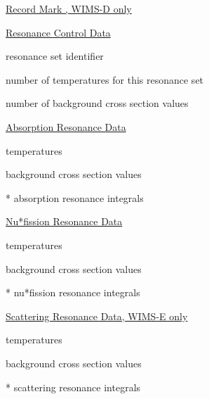 \noindent
\underline{Record Mark , WIMS-D only}
\vspace{12pt}


\noindent
\underline{Resonance Control Data}

\begin{list}{}{\setlength{\leftmargin}{2in}\setlength{\labelwidth}{1.7in}}
\item[\cword{RID}\hfill] resonance set identifier
\item[\cword{NTEMP}\hfill] number of temperatures for this resonance set
\item[\cword{NSIGZ}\hfill] number of background cross section values
\end{list}

\noindent
\underline{Absorption Resonance Data}

\begin{list}{}{\setlength{\leftmargin}{2in}\setlength{\labelwidth}{1.7in}}
\item[\cword{(TEMP(I),I=1,NTEMP)}\hfill] temperatures
\item[\cword{(SIGZ(I),I=1,NSIGZ)}\hfill] background cross section values
\item[\cword{(RESA(I),I=1,NTEMP}*\cword{NSIGZ}\hfill] absorption resonance
   integrals
\end{list}

\noindent
\underline{Nu*fission Resonance Data}

\begin{list}{}{\setlength{\leftmargin}{2in}\setlength{\labelwidth}{1.7in}}
\item[\cword{(TEMP(I),I=1,NTEMP)}\hfill] temperatures
\item[\cword{(SIGZ(I),I=1,NSIGZ)}\hfill] background cross section values
\item[\cword{(RESNF(I),I=1,NTEMP}*\cword{NSIGZ}\hfill] nu*fission resonance
   integrals
\end{list}

\noindent
\underline{Scattering Resonance Data, WIMS-E only}

\begin{list}{}{\setlength{\leftmargin}{2in}\setlength{\labelwidth}{1.7in}}
\item[\cword{(TEMP(I),I=1,NTEMP)}\hfill] temperatures
\item[\cword{(SIGZ(I),I=1,NSIGZ)}\hfill] background cross section values
\item[\cword{(RESS(I),I=1,NTEMP}*\cword{NSIGZ}\hfill] scattering resonance
   integrals
\end{list}



